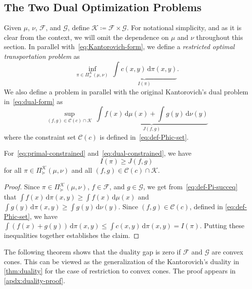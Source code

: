 \documentclass[10pt]{article}
\newcommand{\ud}{\,\mathrm{d}}
\newcommand{\calC}{\mathcal{C}}
\newcommand{\calF}{\mathcal{F}}
\newcommand{\calG}{\mathcal{G}}
\newcommand{\calK}{\mathcal{K}}
\numberwithin{equation}{section}
\begin{document}
\subsection{The Two Dual Optimization Problems}\label{sec:opts-ineq-version}
Given $\mu$, $\nu$, $\calF$, and $\calG$, define $\calK\coloneqq \calF \times \calG$. For notational simplicity, and as it is clear from the context, we will omit the dependence on $\mu$ and $\nu$ throughout this section. In parallel with~\eqref{eq:Kantorovich-form}, we define a {\em restricted optimal transportation problem} as
\begin{equation}\label{eq:primal-constrained}
	\inf_{\pi \in \Pi_\succeq^\calK(\mu,\nu)} 
	~ \underbrace{\int c(x,y)\ud \pi(x,y)}_{I(\pi)}.
\end{equation}
We also define a problem in parallel with the original Kantorovich's dual problem in~\eqref{eq:dual-form} as
\begin{equation}\label{eq:dual-constrained}
	\sup_{(f,g) \in \calC(c) \cap \calK} ~ \underbrace{\int f(x)\ud \mu(x) + \int g(y)\ud \nu(y)}_{J(f,g)}
\end{equation}
where the constraint set $\calC(c)$ is defined in~\eqref{eq:def-Phic-set}. 
\begin{proposition}
For~\eqref{eq:primal-constrained} and~\eqref{eq:dual-constrained}, we have 
\begin{equation*}
	I(\pi)\geq J(f,g)
\end{equation*}
for all $\pi \in \Pi_\succeq^\calK(\mu,\nu)$ and all $(f,g) \in \calC(c) \cap \calK$.
\end{proposition}
\begin{proof}
Since $\pi \in \Pi_\succeq^\calK(\mu,\nu)$, $f \in \calF$, and $g\in\calG$, we get from~\eqref{eq:def-Pi-succeq} that 
$\int f(x) \ud \pi(x,y) \geq \int f(x) \ud \mu(x)$ and 
$\int g(y) \ud \pi(x,y) \geq \int g(y) \ud \nu(y)$. 
Since $(f,g)\in \calC(c)$, defined in \eqref{eq:def-Phic-set}, we have $\int (f(x)+g(y)) \ud \pi(x,y) \leq \int c(x,y)\ud \pi(x,y) = I(\pi)$. 
Putting these inequalities together establishes the claim. 
\end{proof}

The following theorem shows that the duality gap is zero if $\calF$ and $\calG$ are convex cones. This can be viewed as the generalization of the Kantorovich's duality in \autoref{thm:duality} for the case of restriction to convex cones. The proof appears in \autoref{apdx:duality-proof}. 
\end{document}
